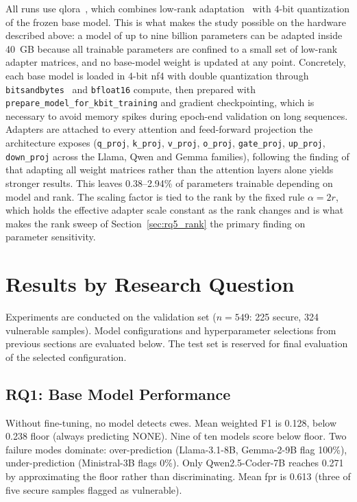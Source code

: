 All runs use \gls{qlora}~\citep{dettmers2023qlora}, which combines low-rank adaptation~\citep{hu2022lora} with 4-bit quantization of the frozen base model. This is what makes the study possible on the hardware described above: a model of up to nine billion parameters can be adapted inside 40~GB because all trainable parameters are confined to a small set of low-rank adapter matrices, and no base-model weight is updated at any point. Concretely, each base model is loaded in 4-bit \gls{nf4} with double quantization through \texttt{bitsandbytes}~\citep{dettmers2022llmint8} and \texttt{bfloat16} compute, then prepared with \texttt{prepare\_model\_for\_kbit\_training} and gradient checkpointing, which is necessary to avoid memory spikes during epoch-end validation on long sequences. Adapters are attached to every attention and feed-forward projection the architecture exposes (\texttt{q\_proj}, \texttt{k\_proj}, \texttt{v\_proj}, \texttt{o\_proj}, \texttt{gate\_proj}, \texttt{up\_proj}, \texttt{down\_proj} across the Llama, Qwen and Gemma families), following the finding of \citet{hu2022lora} that adapting all weight matrices rather than the attention layers alone yields stronger results. This leaves 0.38--2.94\% of parameters trainable depending on model and rank. The scaling factor is tied to the rank by the fixed rule $\alpha = 2r$, which holds the effective adapter scale constant as the rank changes and is what makes the rank sweep of Section~\ref{sec:rq5_rank} the primary finding on parameter sensitivity.

\section{Results by Research Question}

Experiments are conducted on the validation set ($n=549$: 225 secure, 324 vulnerable samples). Model configurations and hyperparameter selections from previous sections are evaluated below. The test set is reserved for final evaluation of the selected configuration.

\subsection{RQ1: Base Model Performance}

Without fine-tuning, no model detects \glspl{cwe}. Mean weighted F1 is 0.128, below 0.238 floor (always predicting NONE). Nine of ten models score below floor. Two failure modes dominate: over-prediction (Llama-3.1-8B, Gemma-2-9B flag 100\%), under-prediction (Ministral-3B flags 0\%). Only Qwen2.5-Coder-7B reaches 0.271 by approximating the floor rather than discriminating. Mean \gls{fpr} is 0.613 (three of five secure samples flagged as vulnerable).

